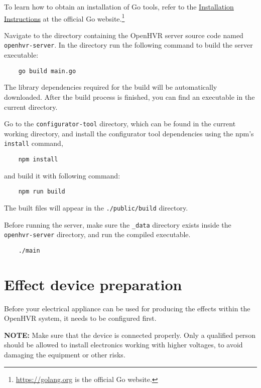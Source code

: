 To learn how to obtain an installation of Go tools, refer to the
\href{https://golang.org/doc/install}{Installation Instructions} at the
official Go website.\footnote{\href{https://golang.org}{https://golang.org} is the official Go website.}

Navigate to the directory containing the OpenHVR server source code named
\verb|openhvr-server|. In the directory run the following command to build the
server executable:

\begin{verbatim}
    go build main.go
\end{verbatim}

The library dependencies required for the build will be automatically downloaded.
After the build process is finished, you can find an executable in the current
directory.

Go to the \verb|configurator-tool| directory, which can be found in the current
working directory, and install the configurator tool dependencies using the npm's
\verb|install| command,

\begin{verbatim}
    npm install
\end{verbatim}

and build it with following command:

\begin{verbatim}
    npm run build
\end{verbatim}

The built files will appear in the \verb|./public/build| directory.

Before running the server, make sure the \verb|_data| directory exists inside
the \verb|openhvr-server| directory, and run the compiled executable.

\begin{verbatim}
    ./main
\end{verbatim}

\section*{Effect device preparation}

Before your electrical appliance can be used for producing the effects
within the OpenHVR system, it needs to be configured first.

\textbf{NOTE:} Make sure that the device is connected properly. Only a qualified
person should be allowed to install electronics working with higher voltages, to avoid
damaging the equipment or other risks.

